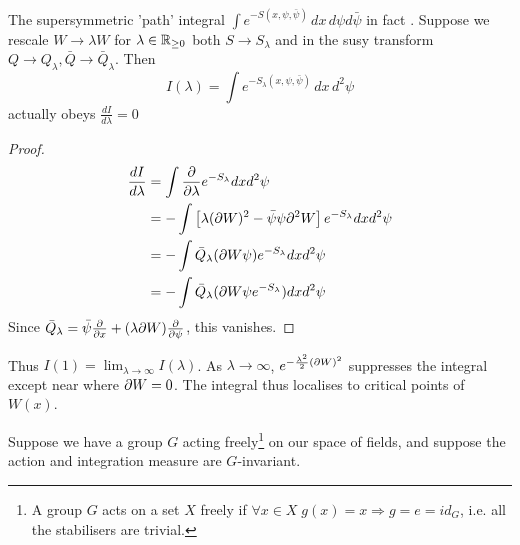 \documentclass{article}
\begin{document}
The supersymmetric 'path' integral $\int e^{-S(x,\psi,\bar{\psi})} \, dx \, d\psi d\bar{\psi}$ in fact . Suppose we rescale $W \to \lambda W $ for $\lambda \in \mathbb{R}_{\geq 0}$ both $S \to S_\lambda$ and in the susy transform $Q\to Q_\lambda, \bar{Q} \to \bar{Q}_\lambda $. Then 
\[
I(\lambda) = \int e^{-S_\lambda(x,\psi,\bar{\psi})} \, dx \, d^2 \psi
\]
actually obeys $\frac{dI}{d\lambda}=0$
\begin{proof}
\begin{align*}
    \frac{dI}{d\lambda} &= \int \frac{\partial}{\partial\lambda} e^{-S_\lambda} dx d^2\psi \\
    &= -\int \left[ \lambda (\partial W)^2 - \bar{\psi}\psi \partial^2 W \right] e^{-S_\lambda} dx d^2\psi \\
    &= -\int \bar{Q}_\lambda (\partial W \psi) e^{-S_\lambda} dx d^2 \psi \\
    &= -\int \bar{Q}_\lambda (\partial W \psi e^{-S_\lambda}) dx d^2 \psi \\
\end{align*}
Since $\bar{Q}_\lambda = \bar{\psi} \frac{\partial}{\partial x} + (\lambda \partial W) \frac{\partial}{\partial\psi}$, this vanishes. 
\end{proof}
Thus $I(1) = \lim_{\lambda \to \infty} I(\lambda)$. As $\lambda \to \infty$, $e^{-\frac{\lambda^2}{2}(\partial W)^2}$ suppresses the integral except near where $\partial W = 0$. The integral thus localises to critical points of $W(x)$. 

Suppose we have a group $G$ acting freely\footnote{A group $G$ acts on a set $X$ freely if $\forall x \in X \; g(x)=x \Rightarrow g=e=id_G$, i.e. all the stabilisers are trivial.} on our space of fields, and suppose the action and integration measure are $G$-invariant. 
\end{document}
